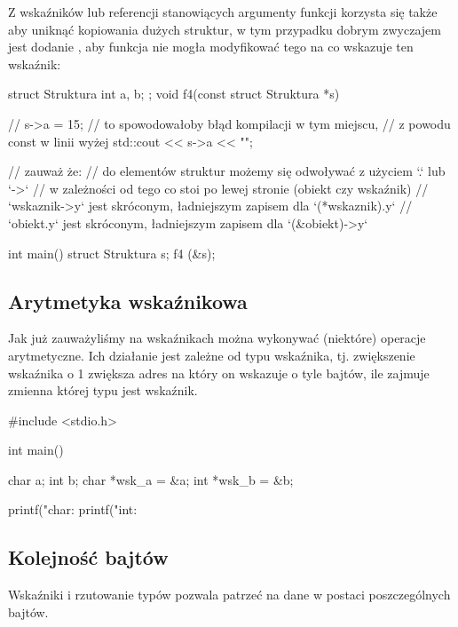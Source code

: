 Z wskaźników lub referencji stanowiących argumenty funkcji korzysta się także
aby uniknąć kopiowania dużych struktur,
w tym przypadku dobrym zwyczajem jest dodanie ,
aby funkcja nie mogła modyfikować tego na co wskazuje ten wskaźnik:

\begin{CodeFrame*}[c]{}
struct Struktura {
  int a, b;
};
void f4(const struct Struktura *s) {
    // s->a = 15; // to spowodowałoby błąd kompilacji w tym miejscu,
                  // z powodu const w linii wyżej
    std::cout << s->a << "\n";
    
    // zauważ że:
    // do elementów struktur możemy się odwoływać z użyciem `.` lub `->`
    // w zależności od tego co stoi po lewej stronie (obiekt czy wskaźnik)
    // `wskaznik->y` jest skróconym, ładniejszym zapisem dla `(*wskaznik).y`
    // `obiekt.y` jest skróconym, ładniejszym zapisem dla `(&obiekt)->y`
}
int main() {
    struct Struktura s;
    f4 (&s);
}
\end{CodeFrame*}


\subsection{Arytmetyka wskaźnikowa}

Jak już zauważyliśmy
na wskaźnikach można wykonywać (niektóre) operacje arytmetyczne.
Ich działanie jest zależne od typu wskaźnika, tj. zwiększenie wskaźnika
o 1 zwiększa adres na który on wskazuje o tyle bajtów,
ile zajmuje zmienna której typu jest wskaźnik.

\begin{CodeFrame*}[c]{}
#include <stdio.h>

int main() {
    char a;    int    b;
    char *wsk_a = &a;
    int    *wsk_b = &b;
    
    printf("char: %
    printf("int:    %
}
\end{CodeFrame*}


\subsection{Kolejność bajtów }

Wskaźniki i rzutowanie typów pozwala patrzeć na dane w postaci poszczególnych bajtów.


